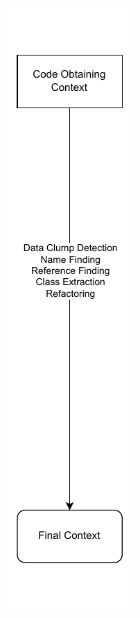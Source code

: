 \begin{figure}[H]
\centering
  \begin{adjustbox}{minipage=\linewidth,scale=0.7}
     \centering
     \begin{subfigure}[b]{0.3\textwidth}
         \centering
         \includegraphics[width=\textwidth]{figures/chapter3/context_pipeline_1.drawio.pdf}

\end{subfigure}
\end{adjustbox}
\end{figure}
